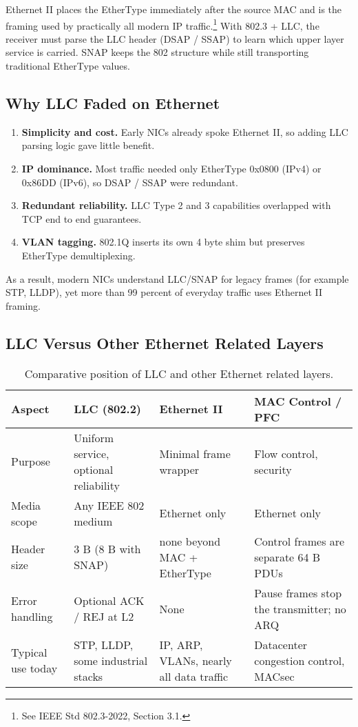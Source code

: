 \documentclass[../../../OAE-SPEC-MAIN.tex]{subfiles}
\begin{document}
Ethernet II places the EtherType immediately after the source MAC and is the framing used by practically all modern IP traffic.\footnote{See IEEE Std 802.3-2022, Section 3.1.}  
With 802.3 + LLC, the receiver must parse the LLC header (DSAP / SSAP) to learn which upper layer service is carried.  
SNAP keeps the 802 structure while still transporting traditional EtherType values.

\subsection{Why LLC Faded on Ethernet}

\begin{enumerate}
  \item \textbf{Simplicity and cost.} Early NICs already spoke Ethernet II, so adding LLC parsing logic gave little benefit.
  \item \textbf{IP dominance.} Most traffic needed only EtherType 0x0800 (IPv4) or 0x86DD (IPv6), so DSAP / SSAP were redundant.
  \item \textbf{Redundant reliability.} LLC Type 2 and 3 capabilities overlapped with TCP end to end guarantees.
  \item \textbf{VLAN tagging.} 802.1Q inserts its own 4 byte shim but preserves EtherType demultiplexing.
\end{enumerate}

As a result, modern NICs understand LLC/SNAP for legacy frames (for example STP, LLDP), yet more than 99 percent of everyday traffic uses Ethernet II framing.

\subsection{LLC Versus Other Ethernet Related Layers}

\begin{table}[h]
\centering
\footnotesize
\begin{tabular}{@{}p{3cm}p{3cm}p{3cm}p{3cm}@{}}
\toprule
\textbf{Aspect} & \textbf{LLC (802.2)} & \textbf{Ethernet II} & \textbf{MAC Control / PFC} \\
\midrule
Purpose & Uniform service, optional reliability & Minimal frame wrapper & Flow control, security \\
Media scope & Any IEEE 802 medium & Ethernet only & Ethernet only \\
Header size & 3 B (8 B with SNAP) & none beyond MAC + EtherType & Control frames are separate 64 B PDUs \\
Error handling & Optional ACK / REJ at L2 & None & Pause frames stop the transmitter; no ARQ \\
Typical use today & STP, LLDP, some industrial stacks & IP, ARP, VLANs, nearly all data traffic & Datacenter congestion control, MACsec \\
\bottomrule
\end{tabular}
\caption{Comparative position of LLC and other Ethernet related layers.}
\end{table}
\end{document}
